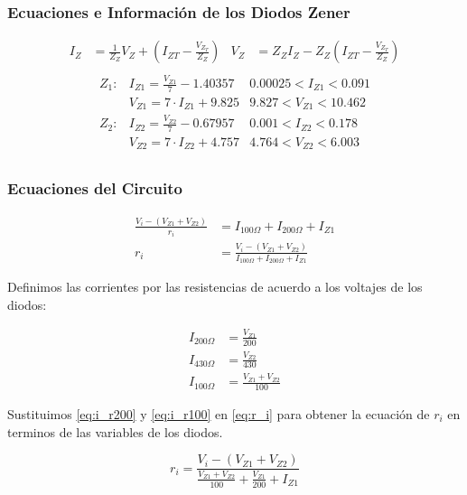 \subsubsection{Ecuaciones e Información de los Diodos Zener}

\begin{align*}
  I_Z &= \frac{1}{Z_Z} V_Z + \left( I_{ZT} - \frac{V_{Z_T}}{Z_Z} \right) &
  V_Z &= Z_Z I_Z - Z_Z \left( I_{ZT} - \frac{V_{Z_T}}{Z_Z} \right)\\
\end{align*}
\begin{align*}
  Z_1 :& I_{Z1} = \frac{V_{Z1}}{7} - 1.40357
       & 0.00025 < I_{Z1} < 0.091\\
       & V_{Z1} = 7 \cdot I_{Z1} + 9.825
       & 9.827 < V_{Z1} < 10.462\\
  Z_2 :& I_{Z2} = \frac{V_{Z2}}{7} - 0.67957
       & 0.001 < I_{Z2} < 0.178 \\
       & V_{Z2} = 7 \cdot I_{Z2} + 4.757
       & 4.764 < V_{Z2} < 6.003\\
\end{align*}

\subsubsection{Ecuaciones del Circuito}

\begin{align}
  \frac{V_i - (V_{Z1}+V_{Z2})}{r_i} &= I_{100\Omega} + I_{200\Omega} + I_{Z1} \nonumber \\
  r_i &= \frac{V_i - (V_{Z1}+V_{Z2})}{I_{100\Omega} + I_{200\Omega} + I_{Z1}} \label{eq:r_i}
\end{align}

Definimos las corrientes por las resistencias de acuerdo a los voltajes de los
diodos:

\begin{align}
  I_{200\Omega} &= \frac{V_{Z1}}{200} \label{eq:i_r200} \\
  I_{430\Omega} &= \frac{V_{Z2}}{430} \label{eq:i_r430} \\
  I_{100\Omega} &= \frac{V_{Z1} + V_{Z2}}{100} \label{eq:i_r100}
\end{align}

Sustituimos \ref{eq:i_r200} y \ref{eq:i_r100} en \ref{eq:r_i} para obtener la
ecuación de $r_i$ en terminos de las variables de los diodos.

\begin{equation} \label{eq:r_ifinal}
  r_i = \frac{V_i - (V_{Z1}+V_{Z2})}{\frac{V_{Z1} + V_{Z2}}{100} + \frac{V_{Z1}}{200} + I_{Z1}}
\end{equation}

